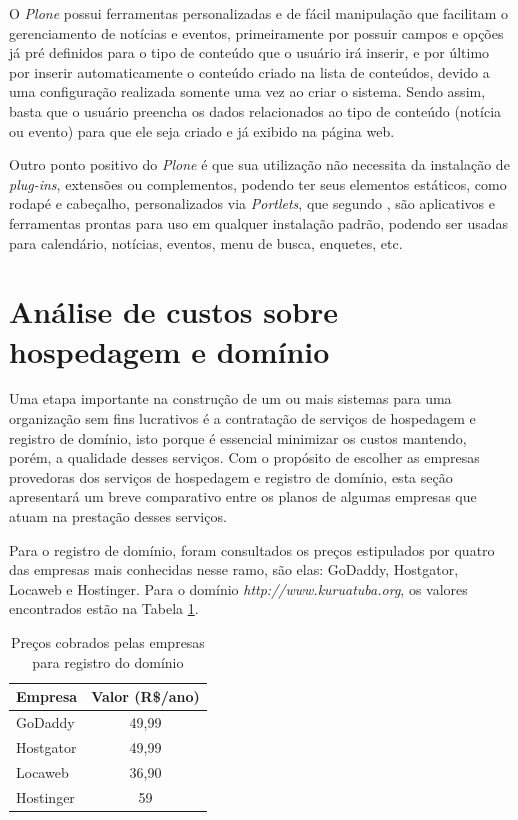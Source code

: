 O \textit{Plone} possui ferramentas personalizadas e de fácil manipulação que facilitam o gerenciamento de notícias e eventos, primeiramente por possuir campos e opções já pré definidos para o tipo de conteúdo que o usuário irá inserir, e por último por inserir automaticamente o conteúdo criado na lista de conteúdos, devido a uma configuração realizada somente uma vez ao criar o sistema. Sendo assim, basta que o usuário preencha os dados relacionados ao tipo de conteúdo (notícia ou evento) para que ele seja criado e já exibido na página web.

Outro ponto positivo do \textit{Plone} é que sua utilização não necessita da instalação de \textit{plug-ins}, extensões ou complementos, podendo ter seus elementos estáticos, como rodapé e cabeçalho, personalizados via \textit{Portlets}, que segundo , são aplicativos e ferramentas prontas para uso em qualquer instalação padrão, podendo ser usadas para calendário, notícias, eventos, menu de busca, enquetes, etc. 

\hspace{2.5cm}
\section{Análise de custos sobre hospedagem e domínio}
\label{sec:hospedagem-dominio}
\hspace{2.5cm}

Uma etapa importante na construção de um ou mais sistemas para uma organização sem fins lucrativos é a contratação de serviços de hospedagem e registro de domínio, isto porque é essencial minimizar os custos mantendo, porém, a qualidade desses serviços. Com o propósito de escolher as empresas provedoras dos serviços de hospedagem e registro de domínio, esta seção apresentará um breve comparativo entre os planos de algumas empresas que atuam na prestação desses serviços.

Para o registro de domínio, foram consultados os preços estipulados por quatro das empresas mais conhecidas nesse ramo, são elas: GoDaddy, Hostgator, Locaweb e Hostinger. Para o domínio \textit{http://www.kuruatuba.org}, os valores encontrados estão na Tabela \ref{comparativo-dominio}. 

\begin{table}[h]
\centering
{}
\caption{Preços cobrados pelas empresas para registro do domínio}
\vspace{0.5cm}

\setlength{\extrarowheight}{0.15cm}
\begin{tabular}{l|c}
 
\textbf{Empresa} & \textbf{Valor (R\$/ano)} \\ %
\hline                               %
GoDaddy & 49,99 \\
Hostgator & 49,99 \\
Locaweb & 36,90 \\
Hostinger & 59 \\

\hline   
\end{tabular}
\label{comparativo-dominio}
\end{table}

